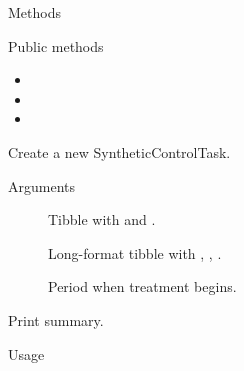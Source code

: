 \documentclass[a4paper]{book}
\begin{document}
\begin{Section}{Methods}
%
\begin{SubSection}{Public methods}
\begin{itemize}

\item{} 
\item{} 
\item{} 

\end{itemize}

\end{SubSection}



\hypertarget{method-SyntheticControlTask-initialize}{}
%
\begin{SubSection}{}
Create a new SyntheticControlTask.
%

%
\begin{SubSubSection}{Arguments}

\begin{description}

\item[] Tibble with  and .
\item[] Long-format tibble with , ,
.
\item[] Period when treatment begins.

\end{description}



\end{SubSubSection}

\end{SubSection}




\hypertarget{method-SyntheticControlTask-print}{}
%
\begin{SubSection}{}
Print summary.
%
\begin{SubSubSection}{Usage}


\end{SubSubSection}
\end{SubSection}
\end{Section}
\end{document}
